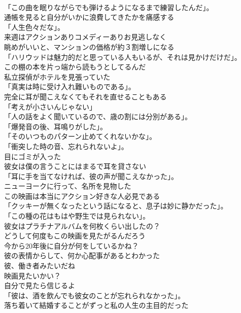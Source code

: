 \documentclass[8pt]{extreport}
\begin{document}
\begin{CJK}{UTF8}{min}
\\	「この曲を眠りながらでも弾けるようになるまで練習したんだ」。	
\\	通帳を見ると自分がいかに浪費してきたかを痛感する	
\\	「人生色々だな」。	
\\	来週はアクションありコメディーありお見逃しなく	
\\	眺めがいいと、マンションの価格が約３割増しになる	
\\	「ハリウッドは魅力的だと思っている人もいるが、それは見かけだけだ」。	
\\	この棚の本を片っ端から読もうとしてるんだ	
\\	私立探偵がホテルを見張っていた	
\\	「真実は時に受け入れ難いものである」。	
\\	完全に耳が聞こえなくてもそれを直せることもある	
\\	「考えが小さいんじゃない」	
\\	「人の話をよく聞いているので、歳の割には分別がある」。	
\\	「爆発音の後、耳鳴りがした」。	
\\	「そのいつものパターン止めてくれないかな」。	
\\	「衝突した時の音、忘れられないよ」。	
\\	目にゴミが入った	
\\	彼女は僕の言うことにはまるで耳を貸さない	
\\	「耳に手を当てなければ、彼の声が聞こえなかった」。	
\\	ニューヨークに行って、名所を見物した	
\\	この映画は本当にアクション好きな人必見である	
\\	「クッキーが無くなったという話になると、息子は妙に静かだった」。	
\\	「この種の花はもはや野生では見られない」。	
\\	彼女はプラチナアルバムを何枚くらい出したの？	
\\	どうして何度もこの映画を見たがるんだろう	
\\	今から20年後に自分が何をしているかね？	
\\	彼の表情からして、何か心配事があるとわかった	
\\	彼、働き者みたいだね	
\\	映画見たいかい？	
\\	自分で見たら信じるよ	
\\	「彼は、酒を飲んでも彼女のことが忘れられなかった」。	
\\	落ち着いて結婚することがずっと私の人生の主目的だった	

\end{CJK}
\end{document}
